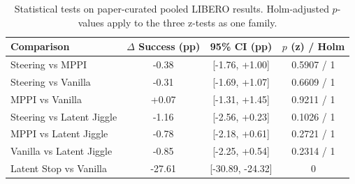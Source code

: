 \begin{table}[t]
\centering
\caption{Statistical tests on paper-curated pooled LIBERO results. Holm-adjusted $p$-values apply to the three z-tests as one family.}
\label{tab:stat_tests}
\begin{tabular}{lccc}
\toprule
Comparison & $\Delta$ Success (pp) & 95\% CI (pp) & $p$ (z) / Holm \\
\midrule
Steering vs MPPI & -0.38 & [-1.76, +1.00] & 0.5907 / 1 \\
Steering vs Vanilla & -0.31 & [-1.69, +1.07] & 0.6609 / 1 \\
MPPI vs Vanilla & +0.07 & [-1.31, +1.45] & 0.9211 / 1 \\
Steering vs Latent Jiggle & -1.16 & [-2.56, +0.23] & 0.1026 / 1 \\
MPPI vs Latent Jiggle & -0.78 & [-2.18, +0.61] & 0.2721 / 1 \\
Vanilla vs Latent Jiggle & -0.85 & [-2.25, +0.54] & 0.2314 / 1 \\
\midrule
Latent Stop vs Vanilla & -27.61 & [-30.89, -24.32] & 0 \\
\bottomrule
\end{tabular}
\end{table}
